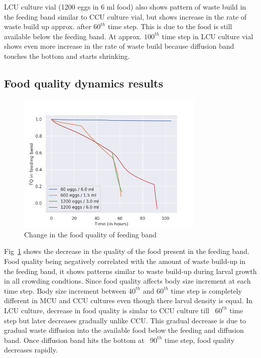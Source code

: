 \noindent LCU culture vial (1200 eggs in 6 ml food) also shows pattern of waste build in the feeding band similar to CCU culture vial, but shows increase in the rate of waste build up approx. after $60^{th}$ time step. This is due to the food is still available below the feeding band. At approx. $100^{th}$ time step in LCU culture vial shows even more increase in the rate of waste build because diffusion band touches the bottom and starts shrinking.\\
\subsection{Food quality dynamics results}
\begin{figure}[h]
  \centering
  \includegraphics[width=0.8\textwidth]{C2/Figs/fQ}
  \caption{Change in the food quality of feeding band}
  \label{fig:fQ}
\end{figure}
\noindent Fig~\ref{fig:fQ} shows the decrease in the quality of the food present in the feeding band. Food quality being negatively correlated with the amount of waste build-up in the feeding band, it shows patterns similar to waste build-up during larval growth in all crowding condtions. Since food quality affects body size increment at each time step. Body size increment between $40^{th}$ and $60^{th}$ time step is completely different in MCU and CCU cultures even though there larval density is equal. In LCU culture, decrease in food quality is simlar to CCU culture till ~$60^{th}$ time step but later decreases gradually unlike CCU. This gradual decrease is due to gradual waste diffusion into the available food below the feeding and diffusion band. Once diffusion band hits the bottom at ~$90^{th}$ time step, food quality decreases rapidly.
\pagebreak
